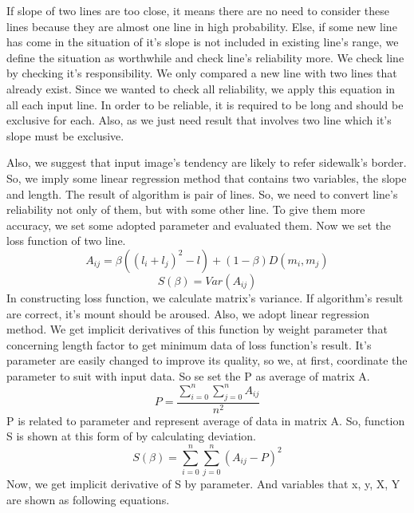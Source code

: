 If slope of two lines are too close, it means there are no need to consider these lines because they are almost one line in high probability. Else, if some new line has come in the situation of it's slope is not included in existing line's range, we define the situation as worthwhile and check line's reliability more. We check line by checking it's responsibility. We only compared a new line with two lines that already exist. Since we wanted to check all reliability, we apply this equation in all each input line. \newline
In order to be reliable, it is required to be long and should be exclusive for each. Also, as we just need result that involves two line which it's slope must be exclusive.

Also, we suggest that input image's tendency are likely to refer sidewalk's border. So, we imply some linear regression method that contains two variables, the slope and length.
The result of algorithm is pair of lines. So, we need to convert line's reliability not only of them, but with some other line. To give them more accuracy, we set some adopted parameter and evaluated them. Now we set the loss function of two line.
\begin{equation}
\mathit{A_{ij} = \beta((l_{i}+l_{j})^{2} - l) +(1-\beta)D(m_i,m_j)}
\end{equation}
\begin{equation}
\mathit{S(\beta) =Var(A_{ij})}
\end{equation}
In constructing loss function, we calculate matrix's variance. If algorithm's result are correct, it's mount should be aroused. Also, we adopt linear regression method. We get implicit derivatives of this function by weight parameter that concerning length factor to get minimum data of loss function's result. It's parameter are easily changed to improve its quality, so we, at first, coordinate the parameter to suit with input data. So se set the P as average of matrix A.
\begin{equation}
\mathit{P = \frac{\sum_{i=0}^{n}{\sum_{j=0}^{n}{A_{ij}}}}{n^{2}}}
\end{equation}
P is related to parameter and represent average of data in matrix A. So, function S is shown at this form of by calculating deviation.
\begin{equation}
\mathit{S(\beta)} =\sum_{i=0}^{n}{\sum_{j=0}^{n}{(A_{ij} - P)^{2}}}
\end{equation}
Now, we get implicit derivative of S by parameter. And variables that x, y, X, Y are shown as following equations.

